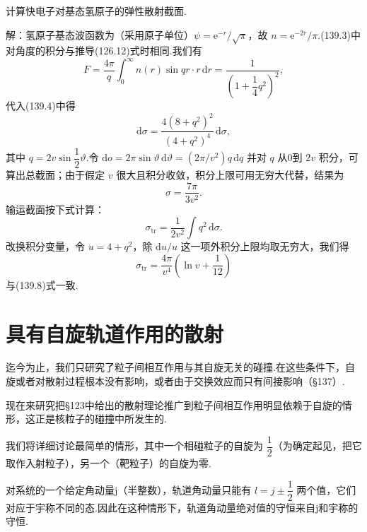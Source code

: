 \begin{xiti}

\quad 计算快电子对基态氢原子的弹性散射截面.

解：氢原子基态波函数为（采用原子单位）$\psi=\mathrm{e}^{-r}/\sqrt{\pi}$，故
$n=\mathrm{e}^{-2r}/\pi$.(139.3)中对角度的积分与推导(126.12)式时相同.我们有
\begin{equation*}
  F=\frac{4\pi}{q}\int_0^{\infty}n(r)\sin qr\cdot r\,\mathrm{d}r
  =\frac{1}{\left(1+\dfrac{1}{4}q^2\right)^{2}},
\end{equation*}
代入(139.4)中得
\begin{equation*}
  \mathrm{d}\sigma=\frac{4(8+q^2)^2}{(4+q^2)^4}\,\mathrm{d}\sigma,
\end{equation*}
其中 $q=2v\sin\dfrac{1}{2}\vartheta$.令
$\mathrm{d}o=2\pi\sin\vartheta\,\mathrm{d}\vartheta=(2\pi/v^2)q\,\mathrm{d}q$
并对 $q$ 从0到 $2v$ 积分，可算出总截面；由于假定 $v$ 很大且积分收敛，积分上限可用无穷大代替，结果为
\begin{equation*}
  \sigma=\frac{7\pi}{3v^2}.
\end{equation*}
输运截面按下式计算：
\begin{equation*}
  \sigma_{\mathrm{tr}}=\frac{1}{2v^2}\int q^2\,\mathrm{d}\sigma.
\end{equation*}
改换积分变量，令 $u=4+q^2$，除 $\mathrm{d}u/u$ 这一项外积分上限均取无穷大，我们得
\begin{equation*}
  \sigma_{\mathrm{tr}}=\frac{4\pi}{v^4}
  \left(\ln v+\frac{1}{12}\right)
\end{equation*}
与(139.8)式一致.

\end{xiti}

\section{具有自旋轨道作用的散射}

迄今为止，我们只研究了粒子间相互作用与其自旋无关的碰撞.在这些条件下，自旋或者对散射过程根本没有影响，或者由于交换效应而只有间接影响（§137）.

现在来研究把§123中给出的散射理论推广到粒子间相互作用明显依赖于自旋的情形，这正是核粒子的碰撞中所发生的.

我们将详细讨论最简单的情形，其中一个相碰粒子的自旋为 $\dfrac{1}{2}$（为确定起见，把它取作入射粒子），另一个（靶粒子）的自旋为零.

对系统的一个给定角动量j（半整数），轨道角动量只能有 $l=j\pm\dfrac{1}{2}$ 两个值，它们对应于宇称不同的态.因此在这种情形下，轨道角动量绝对值的守恒来自j和宇称的守恒.

